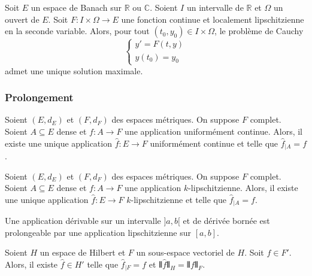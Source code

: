 
	\begin{application}
		Soit $E$ un espace de Banach sur $\mathbb{R}$ ou $\mathbb{C}$. Soient $I$ un intervalle de $\mathbb{R}$ et $\Omega$ un ouvert de $E$. Soit $F : I \times \Omega \rightarrow E$ une fonction continue et localement lipschitzienne en la seconde variable. Alors, pour tout $(t_0, y_0) \in I \times \Omega$, le problème de Cauchy
		\[ \begin{cases} y'=F(t,y) \\ y(t_0) = y_0 \end{cases} \tag{$C$} \]
		admet une unique solution maximale.
	\end{application}

	\subsubsection{Prolongement}


	\begin{theorem}
		Soient $(E,d_E)$ et $(F,d_F)$ des espaces métriques. On suppose $F$ complet. Soient $A \subseteq E$ dense et $f : A \rightarrow F$ une application uniformément continue. Alors, il existe une unique application $\widehat{f} : E \rightarrow F$ uniformément continue et telle que $\widehat{f}_{|A} = f$.
	\end{theorem}

	\begin{corollary}
		Soient $(E,d_E)$ et $(F,d_F)$ des espaces métriques. On suppose $F$ complet. Soient $A \subseteq E$ dense et $f : A \rightarrow F$ une application $k$-lipschitzienne. Alors, il existe une unique application $\widehat{f} : E \rightarrow F$ $k$-lipschitzienne et telle que $\widehat{f}_{|A} = f$.
	\end{corollary}

	\begin{example}
		Une application dérivable sur un intervalle $]a,b[$ et de dérivée bornée est prolongeable par une application lipschitzienne sur $[a,b]$.
	\end{example}


	\begin{application}
		Soient $H$ un espace de Hilbert et $F$ un sous-espace vectoriel de $H$. Soit $f \in F'$. Alors, il existe $\widehat{f} \in H'$ telle que $\widehat{f}_{|F} = f$ et $\VERT \widehat{f} \VERT_{H} = \VERT f \VERT_{F}$.
	\end{application}

